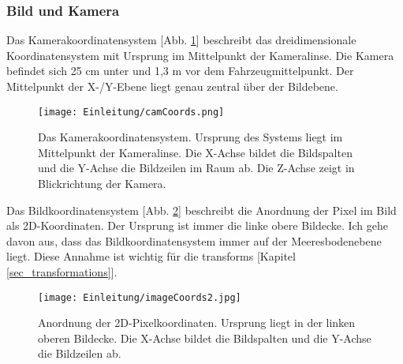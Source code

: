 \subsubsection{Bild und Kamera}
\label{sec_img_cam_coords}
Das Kamerakoordinatensystem [Abb. \ref{CamKoords}] beschreibt das dreidimensionale Koordinatensystem mit Ursprung im Mittelpunkt der Kameralinse. Die Kamera befindet sich 25 cm unter und 1,3 m vor dem Fahrzeugmittelpunkt. Der Mittelpunkt der X-/Y-Ebene liegt genau zentral über der Bildebene.
\begin{figure}[H]
	\centering
	\texttt{[image: Einleitung/camCoords.png]}
	\caption[Das Kamerakoordinatensystem]{Das Kamerakoordinatensystem. Ursprung des Systems liegt im Mittelpunkt der Kameralinse. Die X-Achse bildet die Bildspalten und die Y-Achse die Bildzeilen im Raum ab. Die Z-Achse zeigt in Blickrichtung der Kamera.}
	\label{CamKoords}
\end{figure}

Das Bildkoordinatensystem [Abb. \ref{imageKoords}] beschreibt die Anordnung der Pixel im Bild als 2D-Koordinaten. Der Ursprung ist immer die linke obere Bildecke. Ich gehe davon aus, dass das Bildkoordinatensystem immer auf der Meeresbodenebene liegt. Diese Annahme ist wichtig für die \glspl{transform} [Kapitel \ref{sec_transformations}].
\begin{figure}[H]
	\centering
	\texttt{[image: Einleitung/imageCoords2.jpg]}
	\caption[Das Bildkoordinatensystem]{Anordnung der 2D-Pixelkoordinaten. Ursprung liegt in der linken oberen Bildecke. Die X-Achse bildet die Bildspalten und die Y-Achse die Bildzeilen ab.}
	\label{imageKoords}
\end{figure}

